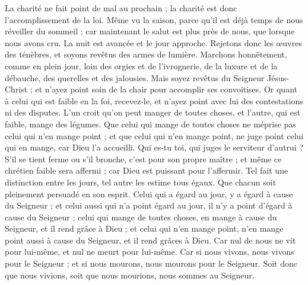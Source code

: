 \begin{multicols}{2}
La charité ne fait point de mal au prochain ; la charité est donc l'accomplissement de la loi.
Même vu la saison, parce qu'il est déjà temps de nous réveiller du sommeil ; car maintenant le salut est plus près de nous, que lorsque nous avons cru.
La nuit est avancée et le jour approche. Rejetons donc les œuvres des ténèbres, et soyons revêtus des armes de lumière.
Marchons honnêtement, comme en plein jour, loin des orgies et de l'ivrognerie, de la luxure et de la débauche, des querelles et des jalousies.
Mais soyez revêtus du Seigneur Jésus-Christ ; et n'ayez point soin de la chair pour accomplir ses convoitises.
\VerseOne{}Or quant à celui qui est faible en la foi, recevez-le, et n'ayez point avec lui des contestations ni des disputes.
L'un croit qu'on peut manger de toutes choses, et l'autre, qui est faible, mange des légumes.
Que celui qui mange de toutes choses ne méprise pas celui qui n'en mange point ; et que celui qui n'en mange point, ne juge point celui qui en mange, car Dieu l'a accueilli.
Qui es-tu toi, qui juges le serviteur d'autrui ? S'il se tient ferme ou s'il bronche, c'est pour son propre maître ; et même ce chrétien faible sera affermi ; car Dieu est puissant pour l'affermir.
Tel fait une distinction entre les jours, tel autre les estime tous égaux. Que chacun soit pleinement persuadé en son esprit.
Celui qui a égard au jour, y a égard à cause du Seigneur ; et celui aussi qui n'a point égard au jour, il n'y a point d'égard à cause du Seigneur ; celui qui mange de toutes choses, en mange à cause du Seigneur, et il rend grâce à Dieu ; et celui qui n'en mange point, n'en mange point aussi à cause du Seigneur, et il rend grâces à Dieu.
Car nul de nous ne vit pour lui-même, et nul ne meurt pour lui-même.
Car si nous vivons, nous vivons pour le Seigneur ; et si nous mourons, nous mourons pour le Seigneur. Soit donc que nous vivions, soit que nous mourions, nous sommes au Seigneur.

\end{multicols}
